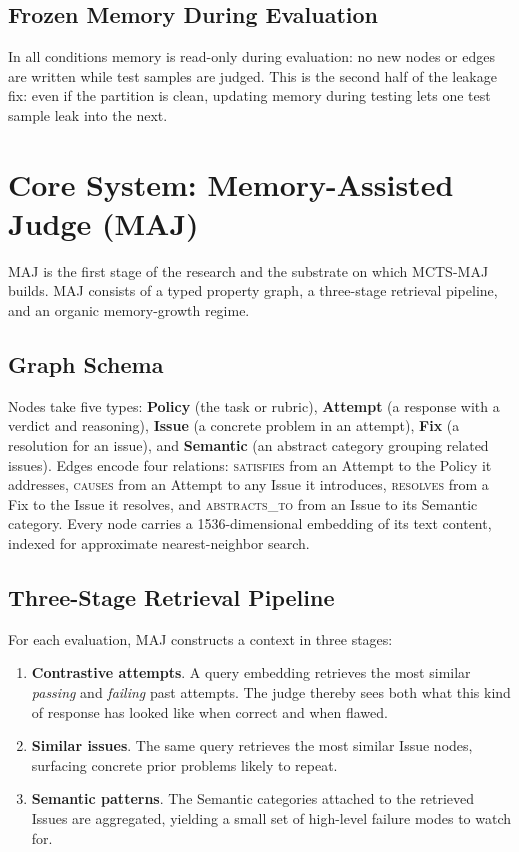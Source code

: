 \documentclass[12pt,a4paper]{report}
\begin{document}
\subsection{Frozen Memory During Evaluation}

In all conditions memory is read-only during evaluation: no new nodes or edges are written while test samples are judged. This is the second half of the leakage fix: even if the partition is clean, updating memory during testing lets one test sample leak into the next.

\section{Core System: Memory-Assisted Judge (MAJ)}
\label{sec:maj}

MAJ is the first stage of the research and the substrate on which MCTS-MAJ builds. MAJ consists of a typed property graph, a three-stage retrieval pipeline, and an organic memory-growth regime.

\subsection{Graph Schema}

Nodes take five types: \textbf{Policy} (the task or rubric), \textbf{Attempt} (a response with a verdict and reasoning), \textbf{Issue} (a concrete problem in an attempt), \textbf{Fix} (a resolution for an issue), and \textbf{Semantic} (an abstract category grouping related issues). Edges encode four relations: \textsc{satisfies} from an Attempt to the Policy it addresses, \textsc{causes} from an Attempt to any Issue it introduces, \textsc{resolves} from a Fix to the Issue it resolves, and \textsc{abstracts\_to} from an Issue to its Semantic category. Every node carries a 1536-dimensional embedding of its text content, indexed for approximate nearest-neighbor search.

\subsection{Three-Stage Retrieval Pipeline}

For each evaluation, MAJ constructs a context in three stages:
\begin{enumerate}
    \item \textbf{Contrastive attempts}. A query embedding retrieves the most similar \textit{passing} and \textit{failing} past attempts. The judge thereby sees both what this kind of response has looked like when correct and when flawed.
    \item \textbf{Similar issues}. The same query retrieves the most similar Issue nodes, surfacing concrete prior problems likely to repeat.
    \item \textbf{Semantic patterns}. The Semantic categories attached to the retrieved Issues are aggregated, yielding a small set of high-level failure modes to watch for.
\end{enumerate}
\end{document}
